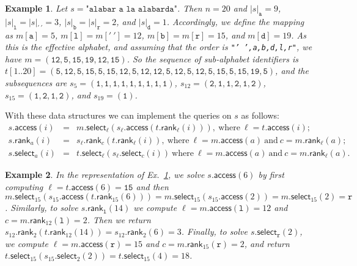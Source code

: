\documentclass[11pt]{article}
\newtheorem{example}{Example}
\newcommand{\occ}[2]
    {\ensuremath{|{#2}|_{#1}}}
\newcommand{\access}
    {\ensuremath{\mathsf{access}}}
\newcommand{\rank}
    {\ensuremath{\mathsf{rank}}}
\newcommand{\select}
    {\ensuremath{\mathsf{select}}}
\newcommand{\mapping}{\ensuremath{{m}}}
\begin{document}
\begin{example} \label{ex:1}
Let $s = \texttt{"alabar a la alabarda"}$. Then $n=20$ and
$\occ{\mathtt{a}}{s} = 9$, $\occ{\mathtt{l}}{s} =
\occ{\mathtt{'\ '}}{s} = 3$, $\occ{\mathtt{b}}{s} =
\occ{\mathtt{r}}{s} = 2$, and $\occ{\mathtt{d}}{s} = 1$.  Accordingly,
we define the mapping as $\mapping[\mathtt{a}] = 5$,
$\mapping[\mathtt{l}] = \mapping[\mathtt{'\ '}] = 12$,
$\mapping[\mathtt{b}] = \mapping[\mathtt{r}] = 15$, and
$\mapping[\mathtt{d}] = 19$. As this is the effective alphabet, and assuming
that the order is \texttt{"'~',a,b,d,l,r"}, we have
$\mapping = (\mathtt{12,5,15,19,12,15})$. So the sequence of sub-alphabet
identifiers is $t[1..20] =
(\mathtt{5,12,5,15,5,15,12,5,12,12,5,12,5,12,5,15,5,15,19,5})$, and the
subsequences are $s_5 =
(\mathtt{1,1,1,1,1,1,1,1,1})$, $s_{12} = (\mathtt{2,1,1,2,1,2})$,
$s_{15} = (\mathtt{1,2,1,2})$, and $s_{19} = (\mathtt{1})$.
\end{example}

With these data structures we can implement the queries on $s$ as follows:
\begin{eqnarray*}
s.\access (i) & = & m.\select_\ell(s_\ell.\access(t.\rank_\ell(i))),
                        ~\textrm{where}~\ell = t.\access(i); \\[1ex]
s.\rank_a (i) & = & s_\ell.\rank_c (t.\rank_\ell (i)),
                        ~\textrm{where}~\ell = \mapping.\access(a)
                        ~\textrm{and}~ c = \mapping.\rank_\ell(a); \\[1ex]
s.\select_a (i) & = & t.\select_\ell (s_\ell.\select_c (i))
                        ~\textrm{where}~\ell = \mapping.\access(a)
                        ~\textrm{and}~ c = \mapping.\rank_\ell(a).
\end{eqnarray*}

\begin{example}
In the representation of Ex.~\ref{ex:1}, we solve
$s.\access(6)$ by first computing $\ell = t.\access(6) = \mathtt{15}$ and
then 
$m.\select_{15}(s_{15}.\access(t.\rank_{15}(6)))
=m.\select_{15}(s_{15}.\access(2))
=m.\select_{15}(2)
=\mathtt{r}$.
Similarly, to solve $s.\rank_\mathtt{l}(14)$ we compute
$\ell = \mapping.\access(\mathtt{l}) = 12$ and
$c = \mapping.\rank_{12}(\mathtt{l}) = 2$. Then we return
$s_{12}.\rank_2 (t.\rank_{12} (14))
=s_{12}.\rank_2 (6)
=3$.
Finally, to solve $s.\select_\mathtt{r}(2)$, we compute 
$\ell = \mapping.\access(\mathtt{r}) = 15$ and
$c = \mapping.\rank_{15}(\mathtt{r}) = 2$, and return
$t.\select_{15} (s_{15}.\select_2(2))
=t.\select_{15} (4)
=18$.
\end{example}
\end{document}
